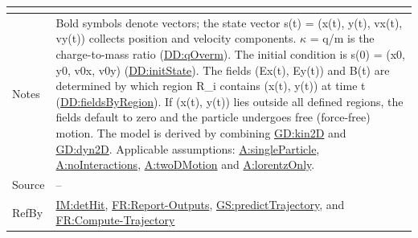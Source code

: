 \documentclass[12pt]{article}
\begin{document}
\begin{minipage}{\textwidth}
\begin{tabular}{>{\raggedright}p{}>{\raggedright\arraybackslash}p{}}
\begin{symbDescription}
              \end{symbDescription}
\\ \midrule
Notes & Bold symbols denote vectors; the state vector s(t) = (x(t), y(t), vx(t), vy(t)) collects position and velocity components. $κ$ = q/m is the charge-to-mass ratio (\hyperref[DD:qOverm]{DD:qOverm}). The initial condition is s(0) = (x0, y0, v0x, v0y) (\hyperref[DD:initState]{DD:initState}). The fields (Ex(t), Ey(t)) and B(t) are determined by which region R\_i contains (x(t), y(t)) at time t (\hyperref[DD:fieldsByRegion]{DD:fieldsByRegion}). If (x(t), y(t)) lies outside all defined regions, the fields default to zero and the particle undergoes free (force-free) motion. The model is derived by combining \hyperref[GD:kin2D]{GD:kin2D} and \hyperref[GD:dyn2D]{GD:dyn2D}. Applicable assumptions: \hyperref[singleParticle]{A:singleParticle}, \hyperref[noInteractions]{A:noInteractions}, \hyperref[twoDMotion]{A:twoDMotion} and \hyperref[lorentzOnly]{A:lorentzOnly}.
        
\\ \midrule
Source & --
         
\\ \midrule
RefBy & \hyperref[IM:detHit]{IM:detHit}, \hyperref[reportOutputs]{FR:Report-Outputs}, \hyperref[predictTrajectory]{GS:predictTrajectory}, and \hyperref[computeTraj]{FR:Compute-Trajectory}
        
\\ \bottomrule
\end{tabular}
\end{minipage}
\end{document}

